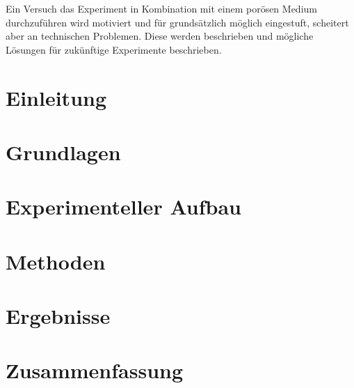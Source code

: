 \documentclass[twoside, a4paper, DIV=11,twocolumn]{book}
\begin{document}
  Ein Versuch das Experiment in Kombination mit einem porösen Medium durchzuführen wird motiviert und für grundsätzlich möglich eingestuft, scheitert aber an technischen Problemen. Diese werden beschrieben und mögliche Lösungen für zukünftige Experimente beschrieben.


\twocolumn
\tableofcontents
\listoffigures

\balance %
\chapter{Einleitung}


\chapter{Grundlagen}


\chapter{Experimenteller Aufbau}


\chapter{Methoden}


\chapter{Ergebnisse}


% 

\chapter{Zusammenfassung}


\onecolumn



\end{document}

